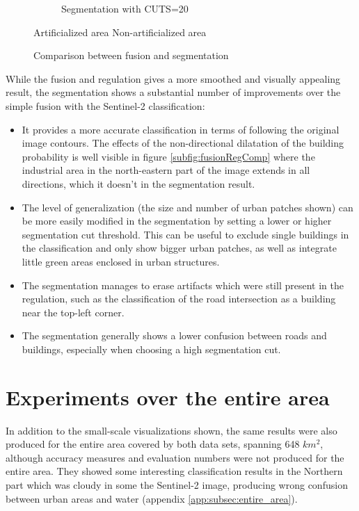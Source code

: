 \documentclass[10pt]{article}
\newcommand{\legendebin}{\vspace{3mm}
    
    \small\centering
    \fcolorbox{black}{red}{\rule{0pt}{6pt}\rule{6pt}{0pt}}\quad Artificialized area 
    \fcolorbox{black}{green}{\rule{0pt}{6pt}\rule{6pt}{0pt}}\quad Non-artificialized area
    }
\begin{document}
\begin{figure}[H]
\begin{subfigure}{0.49\textwidth}
        \caption{Segmentation with CUTS=20}
    \end{subfigure}
    \legendebin
    \caption{Comparison between fusion and segmentation}
    \label{fig:comparison}
\end{figure}
While the fusion and regulation gives a more smoothed and visually appealing result, the segmentation shows a substantial number of improvements over the simple fusion with the Sentinel-2 classification:
\begin{itemize}
    \item It provides a more accurate classification in terms of following the original image contours. The effects of the non-directional dilatation of the building probability is well visible in figure \ref{subfig:fusionRegComp} where the industrial area in the north-eastern part of the image extends in all directions, which it doesn't in the segmentation result.
    \item The level of generalization (the size and number of urban patches shown) can be more easily modified in the segmentation by setting a lower or higher segmentation cut threshold. This can be useful to exclude single buildings in the classification and only show bigger urban patches, as well as integrate little green areas enclosed in urban structures. 
    \item The segmentation manages to erase artifacts which were still present in the regulation, such as the classification of the road intersection as a building near the top-left corner.
    \item The segmentation generally shows a lower confusion between roads and buildings, especially when choosing a high segmentation cut.
\end{itemize}


\section{Experiments over the entire area}
In addition to the small-scale visualizations shown, the same results were also produced for the entire area covered by both data sets, spanning 648 $km^2$, although accuracy measures and evaluation numbers were not produced for the entire area. They showed some interesting classification results in the Northern part which was cloudy in some the Sentinel-2 image, producing wrong confusion between urban areas and water (appendix \ref{app:subsec:entire_area}).
\end{document}
